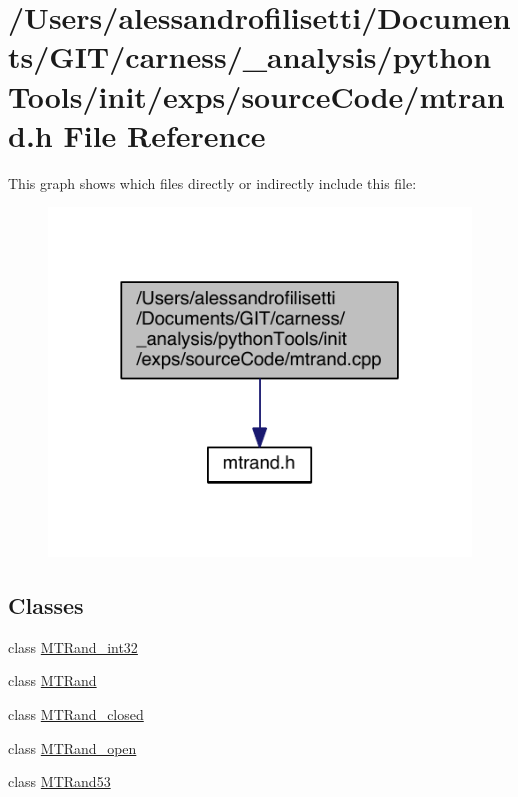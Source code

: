 \hypertarget{a00072}{\section{/\-Users/alessandrofilisetti/\-Documents/\-G\-I\-T/carness/\-\_\-analysis/python\-Tools/init/exps/source\-Code/mtrand.h File Reference}
\label{a00072}
}
This graph shows which files directly or indirectly include this file\-:
\nopagebreak
\begin{figure}[H]
\begin{center}
\leavevmode
\includegraphics[width=350pt]{a00192}
\end{center}
\end{figure}
\subsection*{Classes}
\begin{DoxyCompactItemize}
\item 
class \hyperlink{a00019}{M\-T\-Rand\-\_\-int32}
\item 
class \hyperlink{a00016}{M\-T\-Rand}
\item 
class \hyperlink{a00018}{M\-T\-Rand\-\_\-closed}
\item 
class \hyperlink{a00020}{M\-T\-Rand\-\_\-open}
\item 
class \hyperlink{a00017}{M\-T\-Rand53}
\end{DoxyCompactItemize}
